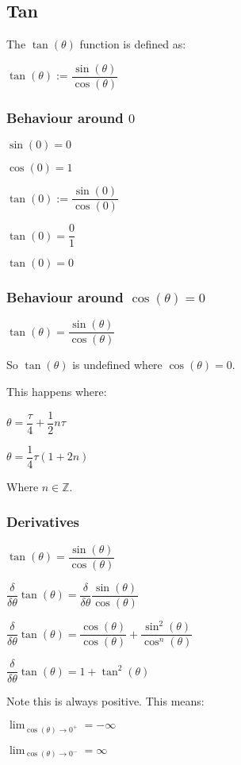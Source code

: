 
\subsection{Tan}


The \(\tan(\theta )\) function is defined as:

\(\tan(\theta ):=\dfrac{\sin(\theta )}{\cos(\theta )}\)

\subsubsection{Behaviour around \(0\)}

\(\sin(0)=0\)

\(\cos(0)=1\)

\(\tan(0):=\dfrac{\sin(0)}{\cos(0)}\)

\(\tan(0)=\dfrac{0}{1}\)

\(\tan(0)=0\)

\subsubsection{Behaviour around \(\cos(\theta )=0\)}

\(\tan(\theta )=\dfrac{\sin(\theta )}{\cos(\theta )}\)

So \(\tan (\theta )\) is undefined where \(\cos(\theta )=0\).

This happens where:

\(\theta=\dfrac{\tau }{4}+\dfrac{1}{2}n\tau \)

\(\theta=\dfrac{1}{4}\tau (1+2n)\)

Where \(n\in \mathbb{Z}\).

\subsubsection{Derivatives}

\(\tan(\theta )=\dfrac{\sin(\theta )}{\cos(\theta )}\)

\(\dfrac{\delta }{\delta \theta } \tan(\theta )=\dfrac{\delta }{\delta \theta }\dfrac{\sin(\theta )}{\cos(\theta )}\)

\(\dfrac{\delta }{\delta \theta } \tan(\theta )=\dfrac{\cos(\theta )}{\cos(\theta )}+ \dfrac{\sin^2(\theta )}{\cos^n(\theta )}\)

\(\dfrac{\delta }{\delta \theta } \tan(\theta )=1+\tan^2(\theta )\)

Note this is always positive. This means:

\(\lim_{\cos(\theta )\rightarrow 0^+}=-\infty\)

\(\lim_{\cos(\theta )\rightarrow 0^-}=\infty\)

